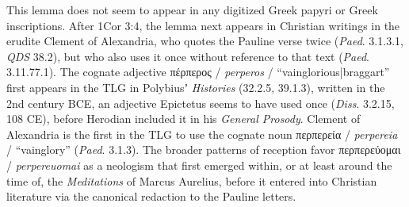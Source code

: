 This lemma does not seem to appear in any digitized Greek papyri or Greek inscriptions. %
After 1Cor 3:4, the lemma next appears in Christian writings in the erudite Clement of Alexandria, %
who quotes the Pauline verse twice (\textit{Paed}. 3.1.3.1, \textit{QDS} 38.2), %
but who also uses it once without reference to that text (\textit{Paed}. 3.11.77.1). %
The cognate adjective πέρπερος / \textit{perperos} / “vainglorious|braggart” first %
appears in the TLG in Polybiusʼ \textit{Histories} (32.2.5, 39.1.3), written in the 2nd century BCE, %
an adjective Epictetus seems to have used once (\textit{Diss}. 3.2.15, 108 CE), %
before Herodian included it in his \textit{General Prosody}. %
Clement of Alexandria is the first in the TLG to use the cognate noun %
περπερεία / \textit{perpereia} / “vainglory” (\textit{Paed}. 3.1.3). %
The broader patterns of reception favor περπερεύομαι / \textit{perpereuomai} as a neologism %
that first emerged within, or at least around the time of, the \textit{Meditations} of Marcus Aurelius, %
before it entered into Christian literature via the canonical redaction to the Pauline letters. %
